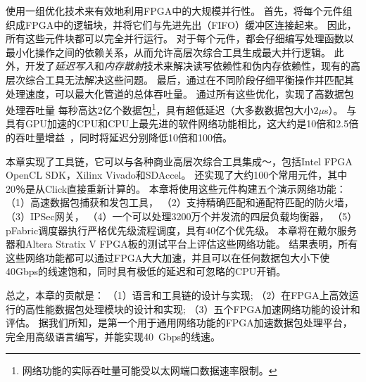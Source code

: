 \name{}使用一组优化技术来有效地利用FPGA中的大规模并行性。
首先，\name{}将每个元件组织成FPGA中的逻辑块，并将它们与先进先出（FIFO）缓冲区连接起来。
因此，所有这些元件块都可以完全并行运行。
对于每个元件，都会仔细编写处理函数以最小化操作之间的依赖关系，从而允许高层次综合工具生成最大并行逻辑。
此外，开发了\textit {延迟写入}和\textit {内存散射}技术来解决读写依赖性和伪内存依赖性，现有的高层次综合工具无法解决这些问题。
最后，通过在不同阶段仔细平衡操作并匹配其处理速度，可以最大化管道的总体吞吐量。
通过所有这些优化，\name{}实现了高数据包处理吞吐量
每秒高达2亿个数据包\footnote {\name{} 网络功能的实际吞吐量可能受以太网端口数据速率限制。}，具有超低延迟（大多数数据包大小$ 2 \mu$s）。
与具有GPU加速的CPU和CPU上最先进的软件网络功能相比，这大约是10倍和2.5倍的吞吐量增益~\cite {packetshader}，同时将延迟分别降低10倍和100倍。

本章实现了\name 工具链，它可以与各种商业高层次综合工具集成〜\cite {vivado,aoc}，包括Intel FPGA OpenCL SDK，Xilinx Vivado和SDAccel。
还实现了大约100个常用元件，其中20％是从Click直接重新计算的。
本章将使用这些元件构建五个演示网络功能：
（1）高速数据包捕获和发包工具，
（2）支持精确匹配和通配符匹配的防火墙，
（3）IPSec网关，
（4）一个可以处理3200万个并发流的四层负载均衡器，
（5）pFabric调度器\cite {pfabric}执行严格优先级流程调度，具有40亿个优先级。
本章将在戴尔服务器和Altera Stratix V FPGA板的测试平台上评估这些网络功能\cite {putnam2014reconfigurable}。
结果表明，所有这些网络功能都可以通过FPGA大大加速，并且可以在任何数据包大小下使40Gbps的线速饱和，同时具有极低的延迟和可忽略的CPU开销。

总之，本章的贡献是：
（1）\name 语言和工具链的设计与实现;
（2）在FPGA上高效运行的高性能数据包处理模块的设计和实现;
（3）五个FPGA加速网络功能的设计和评估。
据我们所知，\name 是第一个用于通用网络功能的FPGA加速数据包处理平台，完全用高级语言编写，并能实现40~Gbps的线速。

